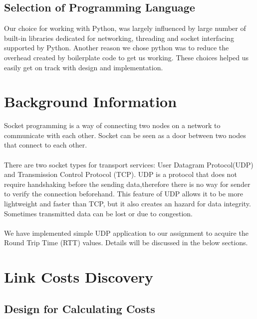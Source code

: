 \documentclass[conference]{IEEEtran}
\begin{document}
\subsection{Selection of Programming Language}
Our choice for working with Python, was largely influenced by large number of built-in libraries dedicated for networking, threading and socket interfacing supported by Python. Another reason we chose python was to reduce the overhead created by boilerplate code to get us working. These choices helped us easily get on track with design and implementation.

\section{Background Information}
Socket programming is a way of connecting two nodes on a network to communicate with each other. Socket can be seen as a door between two nodes that connect to each other. \\
\\
There are two socket types for transport services: User Datagram Protocol(UDP) and Transmission Control Protocol (TCP). UDP is a protocol that does not require handshaking before the sending data,therefore there is no way for sender to verify the connection beforehand. This feature of UDP allows it to be more lightweight and faster than TCP, but it also creates an hazard for data integrity. Sometimes transmitted data can be lost or  due to congestion. \\
\\
We have implemented simple UDP application to our assignment to acquire the Round Trip Time (RTT) values. Details will be discussed in the below sections. 
\\
\section{Link Costs Discovery}

\subsection{Design for Calculating Costs}
\end{document}
